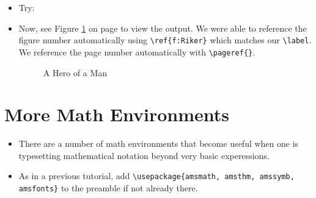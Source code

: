 \begin{itemize}
\item Try: \\

\item Now, see Figure \ref{f:Riker} on page \pageref{f:Riker} to view the
  output. We were able to reference the figure number automatically using
  \verb!\ref{f:Riker}! which matches our \verb!\label!. We reference the page
  number automatically with \verb!\pageref{}!.
  \\

\begin{figure}
  \begin{center}
    \caption{A Hero of a Man} \label{f:Riker}
  \end{center}
\end{figure}

\end{itemize}

\section*{More Math Environments}
\begin{itemize}
\item There are a number of math environments that become useful when
  one is typesetting mathematical notation beyond very basic
  experessions.
\item As in a previous tutorial, add
  \verb!\usepackage{amsmath, amsthm, amssymb, amsfonts}! to the
  preamble if not already there.
\end{itemize}

